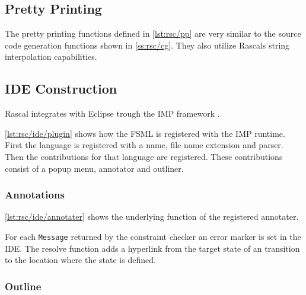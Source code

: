 \subsection{Pretty Printing}

The pretty printing functions defined in \autoref{lst:rsc/pp} are very similar to the source code generation functions shown in \autoref{ss:rsc/cg}.
They also utilize Rascals string interpolation capabilities.




\subsection{IDE Construction}

Rascal integrates with Eclipse trough the IMP framework \cite{van2011rascal}.

\autoref{lst:rsc/ide/plugin} shows how the FSML is registered with the IMP runtime. First the language is registered with a name, file name extension and parser.
Then the contributions for that language are registered.
These contributions consist of a popup menu, annotator and outliner.



\subsubsection{Annotations}

\autoref{lst:rsc/ide/annotater} shows the underlying function of the registered annotater.

For each \lstinline[language=rascal]{Message} returned by the constraint checker an error marker is set in the IDE.
The resolve function adds a hyperlink from the target state of an transition to the location where the state is defined.



\subsubsection{Outline}

